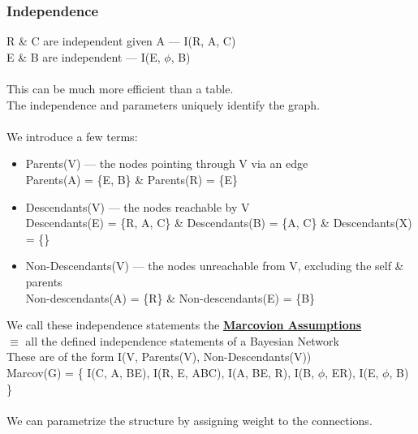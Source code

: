 \documentclass[../../lecture_notes.tex]{subfiles}
\begin{document}
\subsubsection*{Independence}
\noindent R \& C are independent given A — I(R, A, C)\\
E \& B are independent — I(E, $\phi$, B)\\
\\
This can be much more efficient than a table.\\
The independence and parameters uniquely identify the graph.\\
\\
We introduce a few terms:
\begin{itemize} [itemsep=0mm]
	\item Parents(V) — the nodes pointing through V via an edge\\
		Parents(A) = \{E, B\} \& Parents(R) = \{E\}
	\item Descendants(V) — the nodes reachable by V\\
           	Descendants(E) = \{R, A, C\} \& Descendants(B) = \{A, C\} \& Descendants(X) = \{\}
	\item Non-Descendants(V) — the nodes unreachable from V, excluding the self \& parents\\
		Non-descendants(A) = \{R\} \& Non-descendants(E) = \{B\}
\end{itemize}

\noindent We call these independence statements the \textbf{\underline{Marcovion Assumptions}}\\
	\indent $\equiv$ all the defined independence statements of a Bayesian Network\\
	\indent These are of the form I(V, Parents(V), Non-Descendants(V))\\
Marcov(G) = \{ I(C, A, BE), I(R, E, ABC), I(A, BE, R), I(B, $\phi$, ER), I(E, $\phi$, B) \}\\
\\
We can parametrize the structure by assigning weight to the connections.\\
\end{document}
